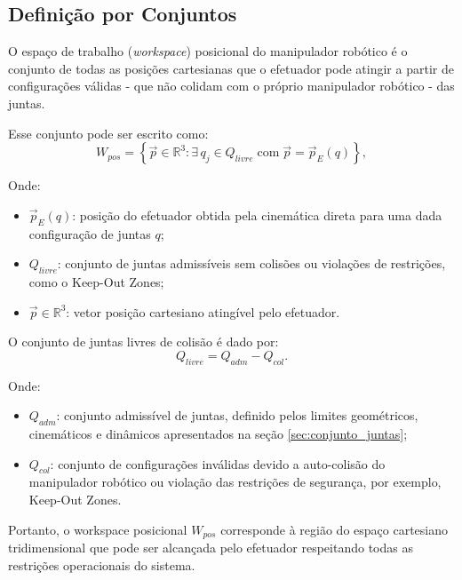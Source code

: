 \subsection{Definição por Conjuntos}
\label{sec:definicao_conjuntos}

O espaço de trabalho (\emph{workspace}) posicional do manipulador robótico é o conjunto de todas as posições cartesianas que o efetuador pode atingir a partir de configurações válidas - que não colidam com o próprio manipulador robótico - das juntas.  

Esse conjunto pode ser escrito como:
\begin{equation}
\label{eq:workspace_posicional}
W_{pos} = \left\{ \vec{p} \in \mathbb{R}^3 : \exists \, q_j \in Q_{livre} \; \text{com} \; \vec{p} = \vec{p}_E(q) \right\},
\end{equation}

Onde:
\begin{itemize}
    \item $\vec{p}_E(q)$: posição do efetuador obtida pela cinemática direta para uma dada configuração de juntas $q$;
    \item $Q_{livre}$: conjunto de juntas admissíveis sem colisões ou violações de restrições, como o Keep-Out Zones;
    \item $\vec{p} \in \mathbb{R}^3$: vetor posição cartesiano atingível pelo efetuador.
\end{itemize}

O conjunto de juntas livres de colisão é dado por:
\begin{equation}
\label{eq:workspace_Qlivre}
Q_{livre} = Q_{adm} - Q_{col}.
\end{equation}

Onde:
\begin{itemize}
    \item $Q_{adm}$: conjunto admissível de juntas, definido pelos limites geométricos, cinemáticos e dinâmicos apresentados na seção \eqref{sec:conjunto_juntas};
    \item $Q_{col}$: conjunto de configurações inválidas devido a auto-colisão do manipulador robótico ou violação das restrições de segurança, por exemplo, Keep-Out Zones.
\end{itemize}

Portanto, o workspace posicional $W_{pos}$ corresponde à região do espaço cartesiano tridimensional que pode ser alcançada pelo efetuador respeitando todas as restrições operacionais do sistema.
